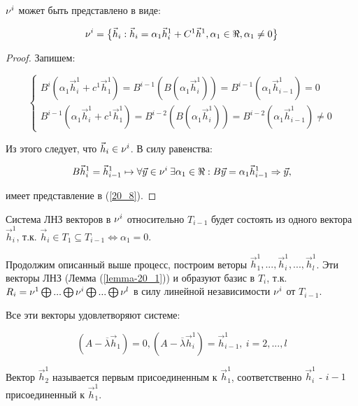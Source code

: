 \begin{proposition}
$\nu^i$ может быть представлено в виде: 

\begin{equation}\label{20_8}
\nu^i = \big\lbrace \vec{h}_i: \vec{h}_i = \alpha_1 \vec{h}_i^1 + C^1 \vec{h}^1, \alpha_1 \in \Re , \alpha_1 \neq 0 \big\rbrace
\end{equation}

\begin{proof}

Запишем:

\begin{equation*}
\begin{cases}
B^i ( \alpha_1\vec{h}_i^1 + c^1 \vec{h}_1^1) = B^{i - 1} (B(\alpha_1 \vec{h}_i^1 )) = B^{i - 1} (\alpha_1 \vec{h}_{i-1}^1) = 0 \\
B^{i-1} ( \alpha_1\vec{h}_i^1 + c^1 \vec{h}_1^1) = B^{i - 2} (B(\alpha_1 \vec{h}_i^1 )) = B^{i - 2} (\alpha_1 \vec{h}_{i-1}^1) \neq 0
\end{cases}
\end{equation*}

Из этого следует, что $\vec{h}_i \in \nu^i$. В силу равенства:

\[B\vec{h}_i^1 = \vec{h}_{i-1}^1 \mapsto \forall \vec{y} \in \nu^i \: \exists \alpha_1 \in \Re : B\vec{y} = \alpha_1\vec{h}_{i-1}^1 \Rightarrow \vec{y},\]

имеет представление в (\ref{20_8}).
\end{proof}
\end{proposition}

Система ЛНЗ векторов в $\nu^i$ относительно $T_{i-1}$ будет состоять из одного вектора $\vec{h}_i^1$, т.к. $\vec{h}_i \in T_1 \subseteq T_{i - 1} \Leftrightarrow \alpha_1 = 0$.

Продолжим описанный выше процесс, построим веторы $\vec{h}_1^1, ... , \vec{h}_i^1 , ... , \vec{h}_l^1$. Эти векторы ЛНЗ (Лемма (\ref{lemma-20_1})) и образуют базис в $T_i$, т.к. $R_i = \nu^1 \bigoplus ... \bigoplus \nu^i \bigoplus ... \bigoplus \nu^l$ в силу линейной независимости $\nu^i$ от $T_{i - 1}$.

Все эти векторы удовлетворяют системе:

\begin{equation}\label{20_9}
(A - \overline{\lambda} \vec{h}_1) = 0, (A - \overline{\lambda} \vec{h}_i^1) = \vec{h}_{i-1}^1, \: i = 2,...,l 
\end{equation}

Вектор $\vec{h}_2^1$ называется первым присоединенным к $\vec{h}_1^1$, соответственно $\vec{h}_i^1$ - $i-1$ присоединенный к $\vec{h}_1^1$.

